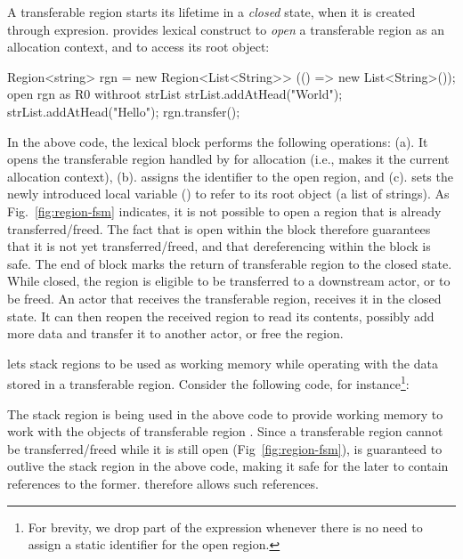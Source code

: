 A transferable region starts its lifetime in a \emph{closed} state,
when it is created through  expresion. \name provides
 lexical construct to \emph{open} a transferable region as an
allocation context, and to access its root object:
\begin{codejava}
  Region<string> rgn = new Region<List<String>>
                        (() => new List<String>());
  open rgn as R0 withroot strList {
    strList.addAtHead("World");
    strList.addAtHead("Hello");
  }
  rgn.transfer();
\end{codejava}
In the above code, the  lexical block performs the
following operations: (a). It opens the transferable region handled by
 for allocation (i.e., makes it the current allocation
context), (b). assigns the identifier  to the open region, and
(c). sets the newly introduced local variable () to refer
to its root object (a list of strings). As Fig.~\ref{fig:region-fsm}
indicates, it is not possible to open a region that is already
transferred/freed. The fact that  is open within the block
therefore guarantees that it is not yet transferred/freed, and that
dereferencing  within the block is safe. The end of
 block marks the return of transferable region to the closed
state.  While closed, the region is eligible to be transferred to a
downstream actor, or to be freed.  An actor that receives the
transferable region, receives it in the closed state. It can then
reopen the received region to read its contents, possibly add more
data and transfer it to another actor, or free the region. 

\name lets stack regions to be used as working memory while operating
with the data stored in a transferable region. Consider the following
code, for instance\footnote{For brevity, we drop  part of the
 expression whenever there is no need to assign a static
identifier for the open region.}:
\begin{codejava}
void onReceive(Region<List<String>> rgn)
  open rgn withroot strList {
    letregion R1 {
      String s = "";
      ListIterator<String> i = strList.listIterator();
      while(i.hasNext()) {
        s += i.getNext();
      }
      print s; //prints "HelloWorld"
    }
  }
  rgn.free();
}
\end{codejava}
The stack region  is being used in the above code to provide
working memory to work with the objects of transferable region
. Since a transferable region cannot be transferred/freed while
it is still open (Fig~\ref{fig:region-fsm}),  is guaranteed to
outlive the stack region  in the above code, making it safe for
the later to contain references to the former. \name therefore allows
such references.

